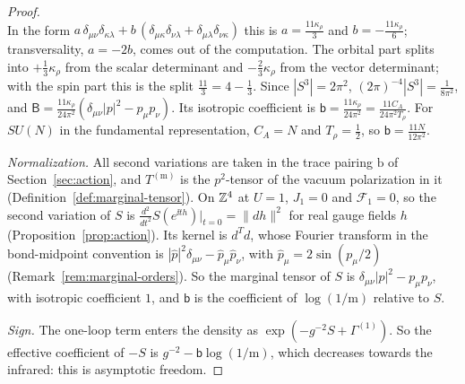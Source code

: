 \begin{proof}
\[\]
In the form $a\,\delta_{\mu\nu}\delta_{\kappa\lambda}+b\,(\delta_{\mu\kappa}\delta_{\nu\lambda}+\delta_{\mu\lambda}\delta_{\nu\kappa})$ this is $a=\frac{11\kappa_\rho}3$ and $b=-\frac{11\kappa_\rho}6$; transversality, $a=-2b$, comes out of the computation. The orbital part splits into $+\frac13\kappa_\rho$ from the scalar determinant and $-\frac23\kappa_\rho$ from the vector determinant; with the spin part this is the split $\frac{11}3=4-\frac13$. Since $|S^3|=2\pi^2$, $(2\pi)^{-4}|S^3|=\frac1{8\pi^2}$, and $\mathsf B=\frac{11\kappa_\rho}{24\pi^2}(\delta_{\mu\nu}|p|^2-p_\mu p_\nu)$. Its isotropic coefficient is $\mathsf b=\frac{11\kappa_\rho}{24\pi^2}=\frac{11C_A}{24\pi^2T_\rho}$. For $SU(N)$ in the fundamental representation, $C_A=N$ and $T_\rho=\frac12$, so $\mathsf b=\frac{11N}{12\pi^2}$.

\emph{Normalization.} All second variations are taken in the trace pairing $\mathrm b$ of Section~\ref{sec:action}, and $T^{(\mathrm m)}$ is the $p^2$-tensor of the vacuum polarization in it (Definition~\ref{def:marginal-tensor}). On $\mathbb Z^4$ at $U=1$, $J_1=0$ and $\mathcal F_1=0$, so the second variation of $S$ is $\frac{d^2}{dt^2}S(e^{\ii th})|_{t=0}=\|dh\|^2$ for real gauge fields $h$ (Proposition~\ref{prop:action}). Its kernel is $d^Td$, whose Fourier transform in the bond-midpoint convention is $|\hat p|^2\delta_{\mu\nu}-\hat p_\mu\hat p_\nu$, with $\hat p_\mu=2\sin(p_\mu/2)$ (Remark~\ref{rem:marginal-orders}). So the marginal tensor of $S$ is $\delta_{\mu\nu}|p|^2-p_\mu p_\nu$, with isotropic coefficient $1$, and $\mathsf b$ is the coefficient of $\log(1/\mathrm m)$ relative to $S$.

\emph{Sign.} The one-loop term enters the density as $\exp(-g^{-2}S+\Gamma^{(1)})$. So the effective coefficient of $-S$ is $g^{-2}-\mathsf b\log(1/\mathrm m)$, which decreases towards the infrared: this is asymptotic freedom.
\end{proof}


